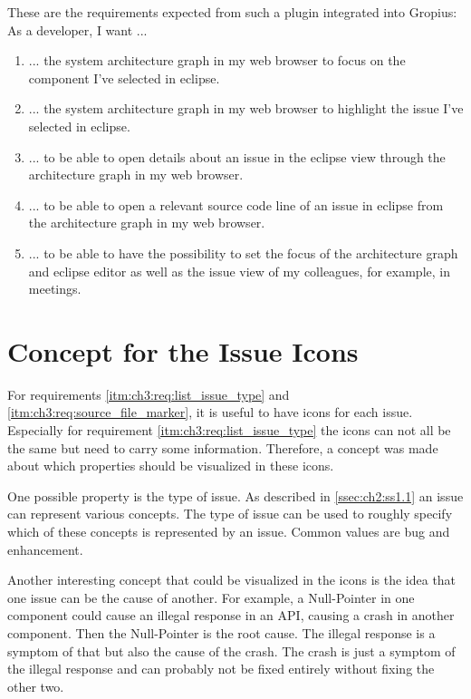 These are the requirements expected from such a plugin integrated into \gls{Gropius}:\\
As a developer, I want ...
\begin{enumerate}
	\setcounter{enumi}{\value{enumarteCounter}} %
	\item ... the system architecture graph in my web browser to focus on the component I've selected in eclipse.
	\item ... the system architecture graph in my web browser to highlight the issue I've selected in eclipse.
	\item ... to be able to open details about an issue in the eclipse view through the architecture graph in my web browser.
	\item ... to be able to open a relevant source code line of an issue in eclipse from the architecture graph in my web browser.
	\item ... to be able to have the possibility to set the focus of the architecture graph and eclipse editor as well as the issue view of my colleagues, for example, in meetings.
\end{enumerate}

\section{Concept for the Issue Icons}
\label{sec:ch3:s2}
For requirements \ref{itm:ch3:req:list_issue_type} and \ref{itm:ch3:req:source_file_marker}, it is useful to have icons for each issue.
Especially for requirement \ref{itm:ch3:req:list_issue_type} the icons can not all be the same but need to carry some information.
Therefore, a concept was made about which properties should be visualized in these icons.

One possible property is the type of issue.
As described in \cref{ssec:ch2:ss1.1} an issue can represent various concepts.
The type of issue can be used to roughly specify which of these concepts is represented by an issue.
Common values are bug and enhancement.

Another interesting concept that could be visualized in the icons is the idea that one issue can be the cause of another.
For example, a Null-Pointer in one component could cause an illegal response in an \gls{API}, causing a crash in another component.
Then the Null-Pointer is the root cause.
The illegal response is a symptom of that but also the cause of the crash.
The crash is just a symptom of the illegal response and can probably not be fixed entirely without fixing the other two.

